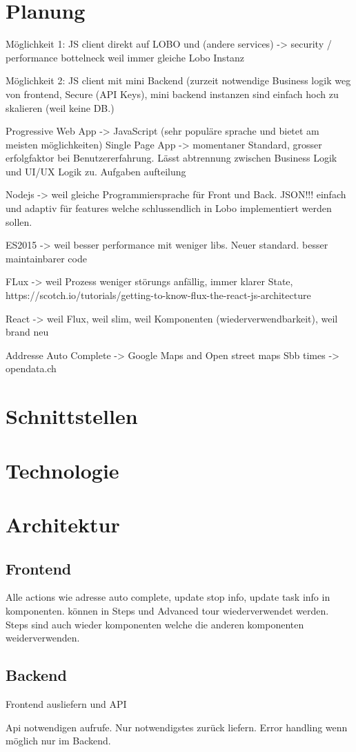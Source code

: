 \section{Planung}
Möglichkeit 1: JS client direkt auf LOBO und (andere services) -> security / performance bottelneck weil immer gleiche Lobo Instanz

Möglichkeit 2: JS client mit mini Backend (zurzeit notwendige Business logik weg von frontend, Secure (API Keys), mini backend instanzen sind einfach hoch zu skalieren (weil keine DB.)

Progressive Web App -> JavaScript (sehr populäre sprache und bietet am meisten möglichkeiten)
Single Page App -> momentaner Standard, grosser erfolgfaktor bei Benutzererfahrung.  Lässt abtrennung zwischen Business Logik und UI/UX Logik zu. Aufgaben aufteilung

Nodejs -> weil gleiche Programmiersprache für Front und Back. JSON!!! einfach und adaptiv für features welche schlussendlich in Lobo implementiert werden sollen.

ES2015 -> weil besser performance mit weniger libs. Neuer standard. besser maintainbarer code

FLux -> weil Prozess weniger störungs anfällig, immer klarer State,
https://scotch.io/tutorials/getting-to-know-flux-the-react-js-architecture

React -> weil Flux, weil slim, weil Komponenten (wiederverwendbarkeit), weil brand neu

Addresse Auto Complete -> Google Maps and Open street maps
Sbb times -> opendata.ch






\section{Schnittstellen}
\section{Technologie}
\section{Architektur}

\subsection{Frontend}
Alle actions wie adresse auto complete, update stop info, update task info in komponenten. können in Steps und Advanced tour wiederverwendet werden. Steps sind auch wieder komponenten welche die anderen komponenten weiderverwenden.

\subsection{Backend}
Frontend ausliefern und API

Api notwendigen aufrufe. Nur notwendigstes zurück liefern. Error handling wenn möglich nur im Backend.
